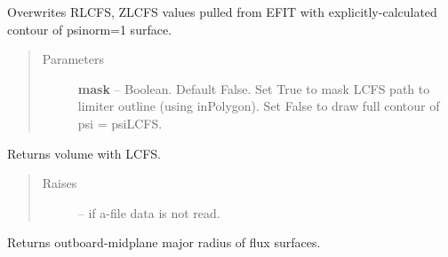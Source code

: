 \documentclass[letterpaper,10pt,english]{sphinxmanual}
\begin{document}
\begin{fulllineitems}
\begin{fulllineitems}
\end{fulllineitems}


\begin{fulllineitems}
\label{eqtools:eqtools.eqdskreader.EqdskReader.remapLCFS}
Overwrites RLCFS, ZLCFS values pulled from EFIT with explicitly-calculated contour
of psinorm=1 surface.
\begin{quote}\begin{description}
\item[{Parameters}] \leavevmode
\textbf{mask} -- Boolean.
Default False.  Set True to mask LCFS path to limiter outline (using inPolygon).
Set False to draw full contour of psi = psiLCFS.

\end{description}\end{quote}

\end{fulllineitems}


\begin{fulllineitems}
\label{eqtools:eqtools.eqdskreader.EqdskReader.getFluxVol}
\end{fulllineitems}


\begin{fulllineitems}
\label{eqtools:eqtools.eqdskreader.EqdskReader.getVolLCFS}
Returns volume with LCFS.
\begin{quote}\begin{description}
\item[{Raises}] \leavevmode
{} -- if a-file data is not read.

\end{description}\end{quote}

\end{fulllineitems}


\begin{fulllineitems}
\label{eqtools:eqtools.eqdskreader.EqdskReader.getRmidPsi}
Returns outboard-midplane major radius of flux surfaces.


\end{fulllineitems}
\end{fulllineitems}
\end{document}
